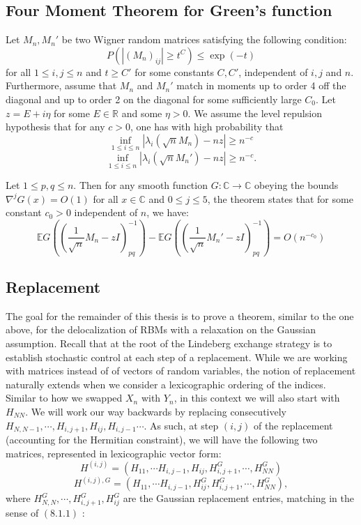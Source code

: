 \documentclass[11pt]{article}
\begin{document}
\subsection*{Four Moment Theorem for Green's function}
Let $M_n, M_n'$ be two Wigner random matrices satisfying the following condition: $$P(|(M_n)_{ij}|\geq t^C)\leq \exp(-t)$$
for all $1\leq i, j\leq n$ and $t\geq C'$ for some constants $C, C'$, independent of $i, j$ and $n$. Furthermore, assume that $M_n$ and $M_n'$ match in moments up to order 4 off the diagonal and up to order 2 on the diagonal for some sufficiently large $C_0$. Let $z = E + i\eta$ for some $E \in \mathbb{R}$ and some $\eta > 0$. We assume the level repulsion hypothesis that for any $c > 0$, one has with high probability that
\begin{equation*}
    \inf_{1 \leq i \leq n} |\lambda_i(\sqrt{n}M_n) - nz| \geq n^{-c}
\end{equation*}
\begin{equation*}
    \inf_{1 \leq i \leq n} |\lambda_i(\sqrt{n}M_n') - nz| \geq n^{-c}.
\end{equation*}

\noindent Let $1 \leq p,q \leq n$. Then for any smooth function $G: \mathbb{C} \to \mathbb{C}$ obeying the bounds $\nabla^j G(x) = O(1)$ for all $x \in \mathbb{C}$ and $0 \leq j \leq 5$, the theorem states that for some constant $c_0 > 0$ independent of $n$, we have:
\begin{equation*}
    \mathbb{E} G \left( \left( \frac{1}{\sqrt{n}} M_n - zI \right)^{-1}_{pq} \right)
    - \mathbb{E} G \left( \left( \frac{1}{\sqrt{n}} M_n' - zI \right)^{-1}_{pq} \right)
    = O(n^{-c_0})
\end{equation*}



\subsection{Replacement}
The goal for the remainder of this thesis is to prove a theorem, similar to the one above, for the delocalization of RBMs with a relaxation on the Gaussian assumption. Recall that at the root of the Lindeberg exchange strategy is to establish stochastic control at each step of a replacement. While we are working with matrices instead of of vectors of random variables, the notion of replacement naturally extends when we consider a lexicographic ordering of the indices. Similar to how we swapped $X_n$ with $Y_n$, in this context we will also start with $H_{NN}$. We will work our way backwards by replacing consecutively $H_{N, N-1}, \cdots,H_{i, j+1},  H_{ij}, H_{i, j-1}\cdots$.  As such, at step $(i, j)$ of the replacement (accounting for the Hermitian constraint), we will have the following two matrices, represented in lexicographic vector form:
$$H^{(i, j)}=(H_{11}, \cdots H_{i, j-1}, H_{ij}, H_{i, j+1}^G, \cdots, H_{NN}^G)$$
$$H^{(i, j), G}=(H_{11}, \cdots H_{i, j-1}, H_{ij}^G, H_{i, j+1}^G, \cdots, H_{NN}^G),$$
where $H_{N, N}^G, \cdots, H_{i, j+1}^G,  H_{ij}^G$ are the Gaussian replacement entries, matching in the sense of $(8.1.1)$ :
\end{document}
